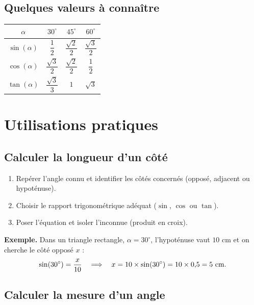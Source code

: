 \documentclass[../main.tex]{subfiles}
\begin{document}
\subsection{Quelques valeurs à connaître}

\begin{center}
\renewcommand{\arraystretch}{1.5}
\begin{tabular}{|c|c|c|c|}
\hline
$\alpha$ & $30^\circ$ & $45^\circ$ & $60^\circ$ \\ \hline
$\sin(\alpha)$ & $\dfrac{1}{2}$ & $\dfrac{\sqrt{2}}{2}$ & $\dfrac{\sqrt{3}}{2}$ \\ \hline
$\cos(\alpha)$ & $\dfrac{\sqrt{3}}{2}$ & $\dfrac{\sqrt{2}}{2}$ & $\dfrac{1}{2}$ \\ \hline
$\tan(\alpha)$ & $\dfrac{\sqrt{3}}{3}$ & $1$ & $\sqrt{3}$ \\ \hline
\end{tabular}
\end{center}

\section{Utilisations pratiques}

\subsection{Calculer la longueur d'un côté}

\begin{methode}
\begin{enumerate}
  \item Repérer l'angle connu et identifier les côtés concernés (opposé, adjacent ou hypoténuse).
  \item Choisir le rapport trigonométrique adéquat ($\sin$, $\cos$ ou $\tan$).
  \item Poser l'équation et isoler l'inconnue (produit en croix).
\end{enumerate}
\end{methode}

\textbf{Exemple.} Dans un triangle rectangle, $\alpha = 30^\circ$, l'hypoténuse vaut $10$ cm et on cherche le côté opposé $x$ :
\[
\sin(30^\circ) = \frac{x}{10} \quad\Longrightarrow\quad x = 10 \times \sin(30^\circ) = 10 \times 0{,} 5 = 5 \text{ cm}.
\]

\subsection{Calculer la mesure d'un angle}
\end{document}
